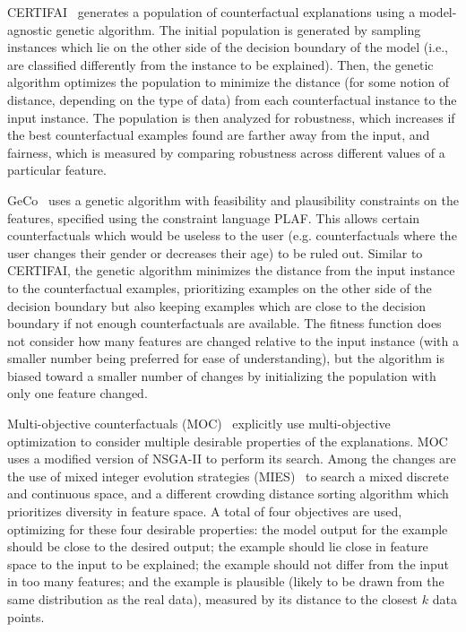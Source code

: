 \documentclass[graybox]{svmult}
\begin{document}
CERTIFAI~\cite{sharmaCERTIFAICommonFramework2020} generates a population of counterfactual explanations using a model-agnostic genetic algorithm. The initial population is generated by sampling instances which lie on the other side of the decision boundary of the model (i.e., are classified differently from the instance to be explained). Then, the genetic algorithm optimizes the population to minimize the distance (for some notion of distance, depending on the type of data) from each counterfactual instance to the input instance. The population is then analyzed for robustness, which increases if the best counterfactual examples found are farther away from the input, and fairness, which is measured by comparing robustness across different values of a particular feature.

GeCo~\cite{schleichGeCoQualityCounterfactual2021} uses a genetic algorithm with feasibility and plausibility constraints on the features, specified using the constraint language PLAF. This allows certain counterfactuals which would be useless to the user (e.g. counterfactuals where the user changes their gender or decreases their age) to be ruled out. Similar to CERTIFAI, the genetic algorithm minimizes the distance from the input instance to the counterfactual examples, prioritizing examples on the other side of the decision boundary but also keeping examples which are close to the decision boundary if not enough counterfactuals are available. The fitness function does not consider how many features are changed relative to the input instance (with a smaller number being preferred for ease of understanding), but the algorithm is biased toward a smaller number of changes by initializing the population with only one feature changed.

Multi-objective counterfactuals (MOC)~\cite{dandlMultiObjectiveCounterfactualExplanations2020} explicitly use multi-objective optimization to consider multiple desirable properties of the explanations. MOC uses a modified version of NSGA-II to perform its search. Among the changes are the use of mixed integer evolution strategies (MIES)~\cite{liMixedIntegerEvolution2013} to search a mixed discrete and continuous space, and a different crowding distance sorting algorithm which prioritizes diversity in feature space. A total of four objectives are used, optimizing for these four desirable properties: the model output for the example should be close to the desired output; the example should lie close in feature space to the input to be explained; the example should not differ from the input in too many features; and the example is plausible (likely to be drawn from the same distribution as the real data), measured by its distance to the closest $k$ data points.
\end{document}
